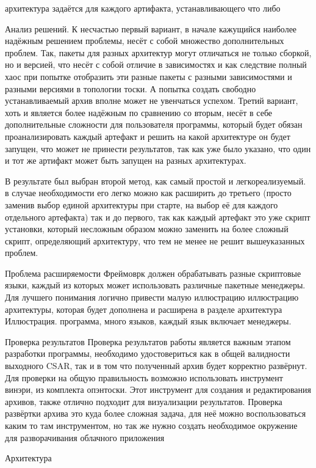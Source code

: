 архитектура задаётся для каждого артифакта, устанавливающего что либо

Анализ решений. К несчастью первый вариант, в начале кажущийся наиболее надёжным решением проблемы, несёт с собой множество дополнительных проблем. Так, пакеты для разных архитектур могут отличаться не только сборкой, но и версией, что несёт с собой отличие в зависимостях и как следствие полный хаос при попытке отобразить эти разные пакеты с разными зависимостями и разными версиями в топологии тоски. А попытка создать свободно устанавливаемый архив вполне может не увенчаться успехом. 
Третий вариант, хоть и является более надёжным по сравнению со вторым, несёт в себе дополнительные сложности для пользователя программы, который будет обязан проанализировать каждый артефакт и решить на какой архитектуре он будет запущен, что может не принести результатов, так как уже было указано, что один и тот же артифакт может быть запущен на разных архитектурах.

В результате был выбран второй метод, как самый простой и легкореализуемый. в случае необходимости его легко можно как расширить до третьего (просто заменив выбор единой архитектуры при старте, на выбор её для каждого отдельного артефакта) так и до первого, так как каждый артефакт это уже скрипт установки, который несложным образом можно заменить на более сложный скрипт, определяющий архитектуру, что тем не менее не решит вышеуказанных проблем.


Проблема расширяемости
Фреймоврк должен обрабатывать разные скриптовые языки, каждый из которых может использовать различные пакетные менеджеры.
Для лучшего понимания логично привести малую иллюстрацию иллюстрацию архитектуры, которая будет дополнена и расширена в разделе архитектура
Иллюстрация. программа, много языков, каждый язык включает менеджеры.

Проверка результатов
Проверка результатов работы является важным этапом разработки программы, необходимо удостовериться как в общей валидности выходного CSAR, так и в том что полученный архив будет корректно развёрнут. 
Для проверки на общую правильность возможно использовать инструмент винэри, из комплекта опэнтоски. Этот инструмент для создания и редактирования архивов, также отлично подходит для визуализации результатов.
Проверка развёртки архива это куда более сложная задача, для неё можно воспользоваться каким то там инструментом, но так же нужно создать необходимое окружение для разворачивания облачного приложения
 



Архитектура


\fi